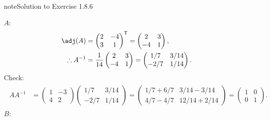 \documentclass[letterpaper,10pt,english]{jupyterBook}
\begin{document}
\begin{sphinxadmonition}{note}{Solution to Exercise 1.8.6}



\sphinxAtStartPar
\(A\):
\begin{equation*}
\begin{split} \begin{align*}
    \adj(A) &=
    \begin{pmatrix} 2 & -4 \\ 3 & 1 \end{pmatrix}^\mathsf{T}
    = 
    \begin{pmatrix} 2 & 3 \\ -4 & 1 \end{pmatrix},  \\
    \therefore A^{-1} &= \frac{1}{14} \begin{pmatrix} 2 & 3 \\ -4 & 1 \end{pmatrix}
    = \begin{pmatrix} 1/7 & 3/14 \\ -2/7 & 1/14 \end{pmatrix}.
\end{align*} \end{split}
\end{equation*}
\sphinxAtStartPar
Check:
\begin{equation*}
\begin{split} \begin{align*}
    AA^{-1} &=
    \begin{pmatrix} 1 & -3 \\ 4 & 2 \end{pmatrix}
    \begin{pmatrix} 1/7 & 3/14 \\ -2/7 & 1/14 \end{pmatrix}
    =
    \begin{pmatrix} 1/7 + 6/7 & 3/14 - 3/14 \\ 4/7 - 4/7 & 12/14 + 2/14 \end{pmatrix}
    = \begin{pmatrix} 1 & 0 \\ 0 & 1 \end{pmatrix}.
\end{align*} \end{split}
\end{equation*}
\sphinxAtStartPar
\(B\):
\begin{equation*}
\begin{split} \begin{align*}

\end{align*}
\end{split}
\end{equation*}
\end{sphinxadmonition}
\end{document}
